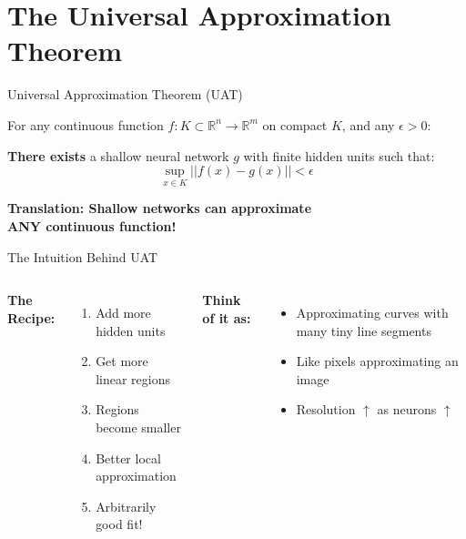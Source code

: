 \documentclass[xcolor=svgnames, 10pt, handout, standalone]{beamer}
\newcommand{\1}{\mathbf{1}}
\begin{document}
\section{The Universal Approximation Theorem}

\begin{frame}{Universal Approximation Theorem (UAT)}
\begin{theorem}
For any continuous function $f: K \subset \mathbb{R}^n \to \mathbb{R}^m$ on compact $K$, and any $\epsilon > 0$:

\textbf{There exists} a shallow neural network $g$ with finite hidden units such that:
\begin{equation}
\sup_{x \in K} ||f(x) - g(x)|| < \epsilon
\end{equation}
\end{theorem}

\pause
\begin{center}
\Large{\textbf{Translation: Shallow networks can approximate\\ANY continuous function!}}
\end{center}
\end{frame}

\begin{frame}{The Intuition Behind UAT}
\begin{columns}
\textbf{The Recipe:}
\begin{enumerate}
    \item<1-> Add more hidden units
    \item<2-> Get more linear regions
    \item<3-> Regions become smaller
    \item<4-> Better local approximation
    \item<5-> Arbitrarily good fit!
\end{enumerate}

\textbf{Think of it as:}
\begin{itemize}
    \item Approximating curves with many tiny line segments
    \item Like pixels approximating an image
    \item Resolution $\uparrow$ as neurons $\uparrow$
\end{itemize}
\end{columns}
\end{frame}
\end{document}
